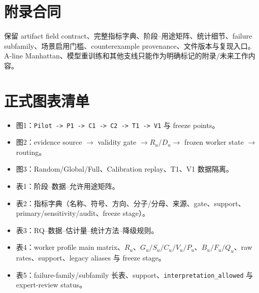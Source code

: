 \documentclass[UTF8,a4paper,12pt]{ctexart}
\begin{document}
\appendix
\section{附录合同}
保留 artifact field contract、完整指标字典、阶段--用途矩阵、统计细节、failure subfamily、场景启用门槛、counterexample provenance、文件版本与复现入口。A-line Manhattan、模型重训练和其他支线只能作为明确标记的附录/未来工作内容。

\section*{正式图表清单}
\begin{itemize}
  \item 图1：\texttt{Pilot -> P1 -> C1 -> C2 -> T1 -> V1} 与 freeze points。
  \item 图2：evidence source $\to$ validity gate $\to R_u/D_u \to$ frozen worker state $\to$ routing。
  \item 图3：Random/Global/Full、Calibration replay、T1、V1 数据隔离。
  \item 表1：阶段--数据--允许用途矩阵。
  \item 表2：指标字典（名称、符号、方向、分子/分母、来源、gate、support、primary/sensitivity/audit、freeze stage）。
  \item 表3：RQ--数据--估计量--统计方法--降级规则。
  \item 表4：worker profile main matrix、$R_u$、$G_u/S_u/C_u/V_u/P_u$、$B_u/F_u/Q_u$、raw rates、support、legacy aliases 与 freeze stage。
  \item 表5：failure-family/subfamily 长表、support、\texttt{interpretation\_allowed} 与 expert-review status。
\end{itemize}
\end{document}
